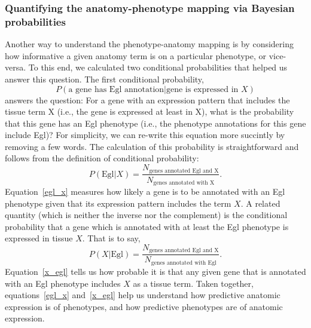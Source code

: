 \documentclass[10pt, onecolumn]{article}
\begin{document}
\subsubsection*{Quantifying the anatomy-phenotype
                mapping via Bayesian probabilities}
Another way to understand the phenotype-anatomy mapping is by considering how
informative a given anatomy term is on a particular phenotype, or vice-versa. To
this end, we calculated two conditional probabilities that helped us answer this
question. The first conditional probability,
\begin{equation}
  P( \text{a gene has Egl annotation} | \text{gene is expressed in } X)
\end{equation}
answers the question: For a gene with an expression pattern that includes the
tissue term X (i.e., the gene is expressed at least in X), what is the
probability that this gene has an Egl phenotype (i.e., the phenotype annotations
for this gene include Egl)? For simplicity, we can re-write this equation more
succintly by removing a few words. The calculation of this probability is
straightforward and follows from the definition of conditional probability:
\begin{equation}
  P(\text{Egl}|X) = \frac{N_\text{genes annotated Egl and X}}
                         {N_\text{genes annotated with X}}.
\label{egl_x}
\end{equation}
Equation~\ref{egl_x} measures how likely a gene is to be annotated with an Egl
phenotype given that its expression pattern includes the term $X$. A related
quantity (which is neither the inverse nor the complement) is the conditional
probability that a gene which is annotated with at least the Egl phenotype is
expressed in tissue $X$. That is to say,
\begin{equation}
  P(X|\text{Egl}) = \frac{N_\text{genes annotated Egl and X}}
                         {N_\text{genes annotated with Egl}}.
  \label{x_egl}
\end{equation}
Equation~\ref{x_egl} tells us how probable it is that any given gene that is
annotated with an Egl phenotype includes $X$ as a tissue term. Taken together,
equations~\ref{egl_x} and~\ref{x_egl} help us understand how predictive anatomic
expression is of phenotypes, and how predictive phenotypes are of anatomic
expression.
\end{document}
